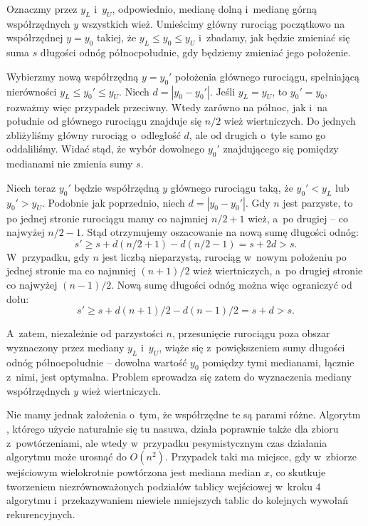 \exercise %
Oznaczmy przez $y_L$ i~$y_U$, odpowiednio, medianę dolną i~medianę górną współrzędnych $y$ wszystkich wież.
Umieścimy główny rurociąg początkowo na współrzędnej $y=y_0$ takiej, że $y_L\le y_0\le y_U$ i~zbadamy, jak będzie zmieniać się suma $s$ długości odnóg północ\nbhyphen południe, gdy będziemy zmieniać jego położenie.

Wybierzmy nową współrzędną $y=y_0'$ położenia głównego rurociągu, spełniającą nierówności $y_L\le y_0'\le y_U$.
Niech $d=|y_0-y_0'|$.
Jeśli $y_L=y_U$, to $y_0'=y_0$, rozważmy więc przypadek przeciwny.
Wtedy zarówno na północ, jak i~na południe od głównego rurociągu znajduje się $n/2$ wież wiertniczych.
Do jednych zbliżyliśmy główny rurociąg o~odległość $d$, ale od drugich o~tyle samo go oddaliliśmy.
Widać stąd, że wybór dowolnego $y_0'$ znajdującego się pomiędzy medianami nie zmienia sumy $s$.

Niech teraz $y_0'$ będzie współrzędną $y$ głównego rurociągu taką, że $y_0'<y_L$ lub $y_0'>y_U$.
Podobnie jak poprzednio, niech $d=|y_0-y_0'|$.
Gdy $n$ jest parzyste, to po jednej stronie rurociągu mamy co najmniej $n/2+1$ wież, a~po drugiej -- co najwyżej $n/2-1$.
Stąd otrzymujemy oszacowanie na nową sumę długości odnóg:
\[
    s' \ge s+d(n/2+1)-d(n/2-1) = s+2d > s.
\]
W~przypadku, gdy $n$ jest liczbą nieparzystą, rurociąg w~nowym położeniu po jednej stronie ma co najmniej $(n+1)/2$ wież wiertniczych, a~po drugiej stronie co najwyżej $(n-1)/2$.
Nową sumę długości odnóg można więc ograniczyć od dołu:
\[
    s' \ge s+d(n+1)/2-d(n-1)/2 = s+d > s.
\]

A~zatem, niezależnie od parzystości $n$, przesunięcie rurociągu poza obszar wyznaczony przez mediany $y_L$ i~$y_U$, wiąże się z~powiększeniem sumy długości odnóg północ\nbhyphen południe -- dowolna wartość $y_0$ pomiędzy tymi medianami, łącznie z~nimi, jest optymalna.
Problem sprowadza się zatem do wyznaczenia mediany współrzędnych $y$ wież wiertniczych.

Nie mamy jednak założenia o~tym, że współrzędne te są parami różne.
Algorytm , którego użycie naturalnie się tu nasuwa, działa poprawnie także dla zbioru z~powtórzeniami, ale wtedy w~przypadku pesymistycznym czas działania algorytmu może urosnąć do $O(n^2)$.
Przypadek taki ma miejsce, gdy w~zbiorze wejściowym wielokrotnie powtórzona jest mediana median $x$, co skutkuje tworzeniem niezrównoważonych podziałów tablicy wejściowej w~kroku 4 algorytmu i~przekazywaniem niewiele mniejszych tablic do kolejnych wywołań rekurencyjnych.

